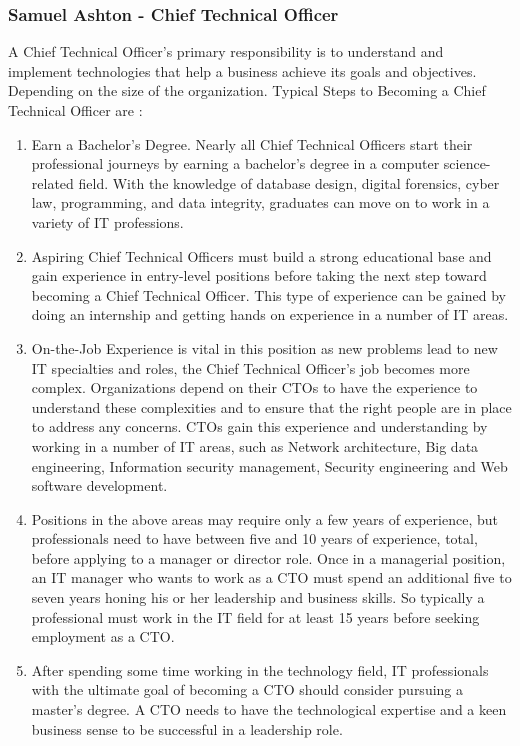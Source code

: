 \documentclass[11pt, oneside, a4paper, titlepage]{article}
\begin{document}
\subsubsection{Samuel Ashton - Chief Technical Officer}
A Chief Technical Officer’s primary responsibility is to understand and implement technologies that help a business achieve its goals and objectives. Depending on the size of the organization. Typical Steps to Becoming a Chief Technical Officer are : 
\begin{enumerate}
	\item
    Earn a Bachelor’s Degree. Nearly all Chief Technical Officers start their professional journeys by earning a bachelor’s degree in a computer science-related field. With the knowledge of database design, digital forensics, cyber law, programming, and data integrity, graduates can move on to work in a variety of IT professions.  
    \item
    Aspiring Chief Technical Officers must build a strong educational base and gain experience in entry-level positions before taking the next step toward becoming a Chief Technical Officer. This type of experience can be gained by doing an internship and getting hands on experience in a number of IT areas. 
    \item
    On-the-Job Experience is vital in this position as new problems lead to new IT specialties and roles, the Chief Technical Officer’s job becomes more complex. Organizations depend on their CTOs to have the experience to understand these complexities and to ensure that the right people are in place to address any concerns. CTOs gain this experience and understanding by working in a number of IT areas, such as Network architecture, Big data engineering, Information security management, Security engineering and Web software development. 
    \item
    Positions in the above areas may require only a few years of experience, but professionals need to have between five and 10 years of experience, total, before applying to a manager or director role. Once in a managerial position, an IT manager who wants to work as a CTO must spend an additional five to seven years honing his or her leadership and business skills. So typically a professional must work in the IT field for at least 15 years before seeking employment as a CTO.  
    \item
    After spending some time working in the technology field, IT professionals with the ultimate goal of becoming a CTO should consider pursuing a master’s degree. A CTO needs to have the technological expertise and a keen business sense to be successful in a leadership role.  
\end{enumerate}
\end{document}
